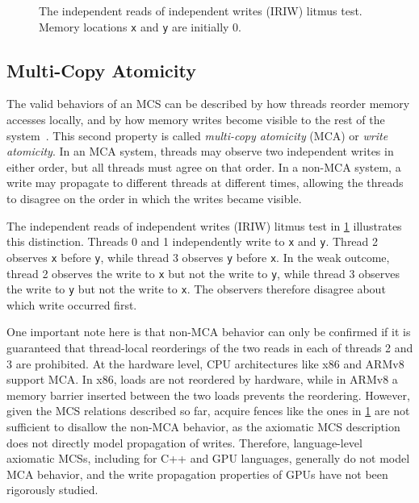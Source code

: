 \begin{figure}
\centering
\footnotesize
\iriwlitmustest
\caption{The independent reads of independent writes (IRIW) litmus test. Memory locations \texttt{x} and \texttt{y} are initially 0.}
\label{fig:bg-iriw}
\end{figure}

\subsection{Multi-Copy Atomicity \label{sec:bg-multi-copy-atomicity}}

The valid behaviors of an MCS can be described by how threads reorder memory accesses locally, and by how memory writes become visible to the rest of the system~\cite{arvind2006memmodel}. This second property is called \textit{multi-copy atomicity} (MCA) or \textit{write atomicity}. In an MCA system, threads may observe two independent writes in either order, but all threads must agree on that order. In a non-MCA system, a write may propagate to different threads at different times, allowing the threads to disagree on the order in which the writes became visible.

The independent reads of independent writes (IRIW) litmus test in \myfig\ref{fig:bg-iriw} illustrates this distinction. Threads 0 and 1 independently write to \texttt{x} and \texttt{y}. Thread 2 observes \texttt{x} before \texttt{y}, while thread 3 observes \texttt{y} before \texttt{x}. In the weak outcome, thread 2 observes the write to \texttt{x} but not the write to \texttt{y}, while thread 3 observes the write to \texttt{y} but not the write to \texttt{x}. The observers therefore disagree about which write occurred first.

One important note here is that non-MCA behavior can only be confirmed if it is guaranteed that thread-local reorderings of the two reads in each of threads 2 and 3 are prohibited. At the hardware level, CPU architectures like x86 and ARMv8~\cite{flur2016arm} support MCA. In x86, loads are not reordered by hardware, while in ARMv8 a memory barrier inserted between the two loads prevents the reordering. However, given the MCS relations described so far, acquire fences like the ones in \myfig\ref{fig:bg-iriw} are not sufficient to disallow the non-MCA behavior, as the axiomatic MCS description does not directly model propagation of writes. Therefore, language-level axiomatic MCSs, including for C++ and GPU languages, generally do not model MCA behavior, and the write propagation properties of GPUs have not been rigorously studied.

